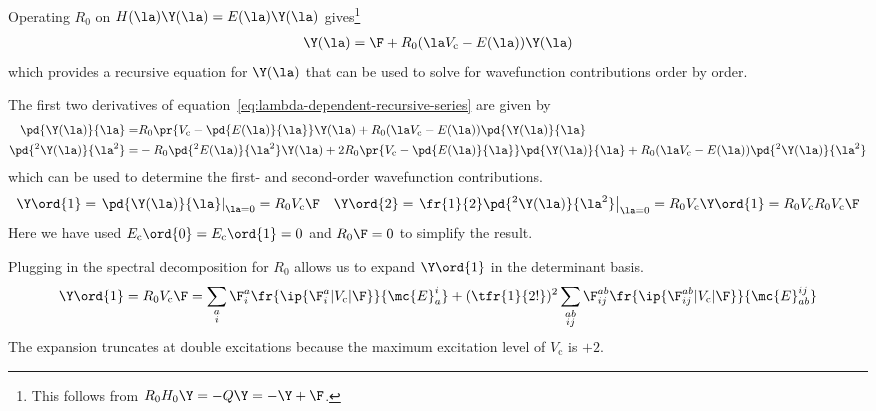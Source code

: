 \begin{samepage}
\begin{rmk}
Operating $R_0$ on $H(\la)\Y(\la)=E(\la)\Y(\la)$ gives\footnote{This follows from $R_0H_0\Y=-Q\Y=-\Y+\F$.}
\begin{align}
\label{eq:lambda-dependent-recursive-series}
  \Y(\la)
=
  \F
+
  R_0
  (
    \la V_{\text{c}}
  -
    E(\la)
  )
  \Y(\la)
\end{align}
which provides a recursive equation for $\Y(\la)$ that can be used to solve for wavefunction contributions order by order.
\end{rmk}
\end{samepage}

\begin{ex}
The first two derivatives of equation~\ref{eq:lambda-dependent-recursive-series} are given by
\begin{align*}
  \pd{\Y(\la)}{\la}
=&
  R_0
  \pr{
    V_{\text{c}}
  -
    \pd{E(\la)}{\la}
  }
  \Y(\la)
+
  R_0
  (
    \la V_{\text{c}}
  -
    E(\la)
  )
  \pd{\Y(\la)}{\la}
\\
  \pd{^2\Y(\la)}{\la^2}
=&
-
  R_0
  \pd{^2E(\la)}{\la^2}
  \Y(\la)
+
  2
  R_0
  \pr{
    V_{\text{c}}
  -
    \pd{E(\la)}{\la}
  }
  \pd{\Y(\la)}{\la}
+
  R_0
  (
    \la V_{\text{c}}
  -
    E(\la)
  )
  \pd{^2\Y(\la)}{\la^2}
\end{align*}
which can be used to determine the first- and second-order wavefunction contributions.
\begin{align}
\label{eq:first-and-second-order-principal-terms}
  \Y\ord{1}
=
  \left.
  \pd{\Y(\la)}{\la}
  \right|_{\la=0}
=
  R_0
  V_{\text{c}}
  \F
&&
  \Y\ord{2}
=
  \left.
  \fr{1}{2}
  \pd{^2\Y(\la)}{\la^2}
  \right|_{\la=0}
=
  R_0
  V_{\text{c}}
  \Y\ord{1}
=
  R_0
  V_{\text{c}}
  R_0
  V_{\text{c}}
  \F
\end{align}
Here we have used $E_{\text{c}}\ord{0}=E_{\text{c}}\ord{1}=0$ and $R_0\F=0$ to simplify the result.
\end{ex}

\begin{ex}
\label{ex:first-order-wavefunction-expansion-unsimplified}
Plugging in the spectral decomposition for $R_0$ allows us to expand $\Y\ord{1}$ in the determinant basis.
\begin{align}
\label{eq:first-order-wavefunction-expansion-unsimplified}
  \Y\ord{1}
=
  R_0
  V_{\text{c}}
  \F
=
  \sum_{\substack{a\\i}}
  \F_i^a
  \fr{\ip{\F_i^a|V_{\text{c}}|\F}}{\mc{E}_a^i}
+
  (\tfr{1}{2!})^2
  \sum_{\substack{ab\\ij}}
  \F_{ij}^{ab}
  \fr{\ip{\F_{ij}^{ab}|V_{\text{c}}|\F}}{\mc{E}_{ab}^{ij}}
\end{align}
The expansion truncates at double excitations because the maximum excitation level of $V_{\text{c}}$ is $+2$.
\end{ex}

